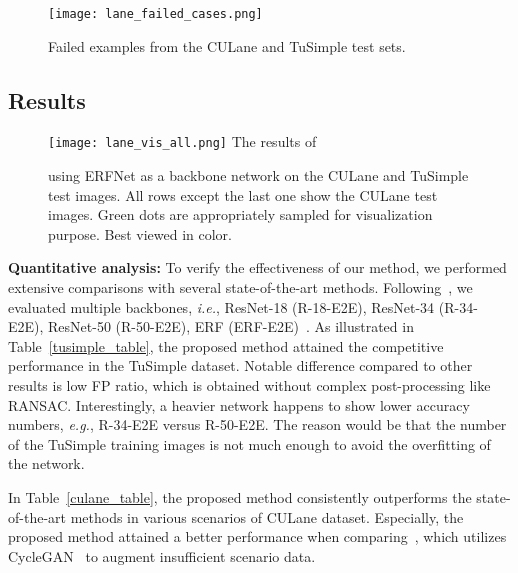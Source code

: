 \documentclass[10pt,twocolumn,letterpaper]{article}
\begin{document}
\begin{figure}[t]
	\centering
	\texttt{[image: lane\_failed\_cases.png]}
	\caption{Failed examples from the CULane and TuSimple test sets.}
	\label{fig:results_failed}
\end{figure}
\subsection{Results}

\begin{figure*}[t]
	\centering
	\texttt{[image: lane\_vis\_all.png]}
	The results of \caption{\textbf{\algorithmname} using ERFNet as a backbone network on the CULane and TuSimple test images. All rows except the last one show the CULane test images. Green dots are appropriately sampled for visualization purpose. Best viewed in color.}
	\label{fig:results_all}
	\vspace{1px}
\end{figure*}


\textbf{Quantitative analysis:} To verify the effectiveness of our method, we performed extensive comparisons with several state-of-the-art methods. Following~\cite{SAD}, we evaluated multiple backbones, \textit{i.e.}, ResNet-18 (R-18-E2E), ResNet-34 (R-34-E2E), ResNet-50 (R-50-E2E), ERF (ERF-E2E)~\cite{ERFNet}.  As illustrated in Table~\ref{tusimple_table}, the proposed method attained the competitive performance in the TuSimple dataset. Notable difference compared to other results is low FP ratio, which is obtained without complex post-processing like RANSAC. Interestingly, a heavier network happens to show lower accuracy numbers, \textit{e.g.}, R-34-E2E versus R-50-E2E. The reason would be that the number of the TuSimple training images is not much enough to avoid the overfitting of the network.

In Table~\ref{culane_table}, the proposed method consistently outperforms the state-of-the-art methods in various scenarios of CULane dataset. Especially, the proposed method attained a better performance when comparing~\cite{LaneGan}, which utilizes CycleGAN~\cite{cyclegan} to augment insufficient scenario data.
\end{document}

